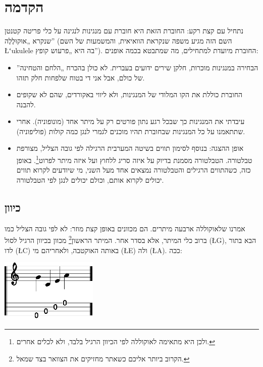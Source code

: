 \section*{הקדמה}

נתחיל עם קצת רקע: החוברת הזאת היא חוברת עם מנגינות לנגינה על כלי פריטה קטנטן שנקרא „אוּקוּלֶלֶה” (השם הזה מגיע משפה שנקראת הוואיאית, והמשמעות של  השם \L{{ʻ}ukulele} בה היא „פרעוש קופץ”). החוברת מיועדת למתחילים, מה שמתבטא בכמה אופנים:
\begin{itemize}
	\item הבחירה במנגינות מוכרות, חלקן שירים ידועים בעברית. לא כולן בהכרח „הלחם והטחינה” של כולם, אבל אני די בטוח שלפחות חלק תזהו.
	\item החוברת כוללת את הקו המלודי של המנגינות, ולא ליווי באקורדים, שהם לא שקופים להבנה.
	\item עיבדתי את המנגינות כך שבכל רגע נתון פורטים רק על מיתר אחד (מונופוניה). אחרי שתתאמנו על כל המנגינות שבחוברת תהיו מוכנים לגמרי לנגן כמה קולות (פוליפוניה).
	\item אופן ההצגה: בנוסף לסימון תווים בשיטה המערבית הרגילה לפי גובה הצליל, מצורפת טבלטורה. הטבלטורה מסמנת בדיוק על איזה סריג ללחוץ ועל איזה מיתר לפרוט\footnote{ולכן היא מתאימה לאוקוללה לפי הכיוון הרגיל בלבד, ולא לכלים אחרים.}. באופן כזה, כשהתווים הרגילים והטבלטורה נמצאים אחד מעל השני, מי שיודעים לקרוא תווים יכולים לקרוא אותם, וכולם יכולים לנגן לפי הטבלטורה.
\end{itemize}



\subsection*{כיוון}

אמרנו שלאוקוללה ארבעה מיתרים. הם מכוונים באופן קצת מוזר: לא לפי גובה הצליל כמו ברוב כלי המיתר, אלא בסדר אחר. המיתר הראשון\footnote{הקרוב ביותר אליכם כשאתר מחזיקים את הצוואר בצד שמאל.} מכוון בכיוון הרגיל לסול (\L{G}), הבא בתור לדו (\L{C}) באותה האוקטבה, ולאחריהם מי (\L{E}) ולה (\L{A}). ככה:

\begin{center}
	\includegraphics[height=3cm]{agordo.eps}
\end{center}

